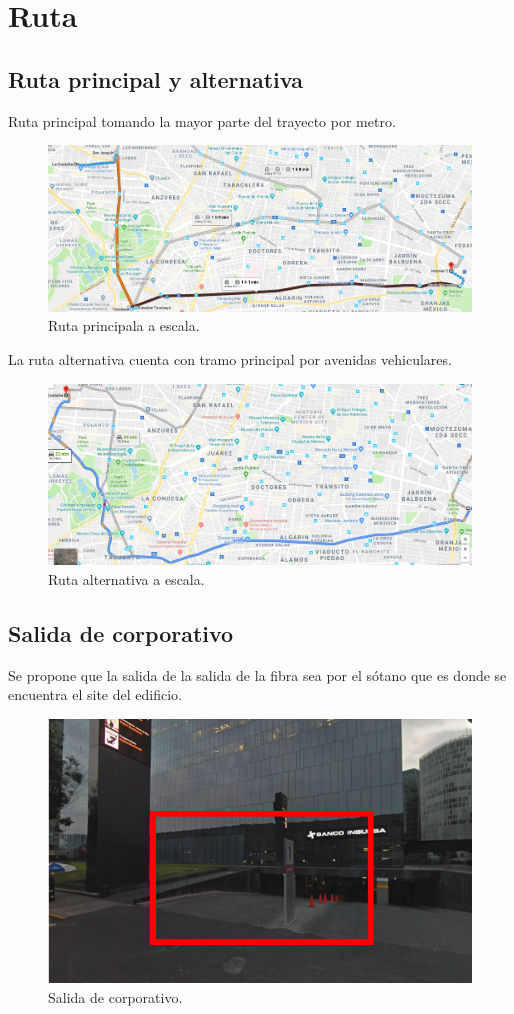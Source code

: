 \documentclass[12pt,letterpaper]{article}
\begin{document}


\newpage
\tableofcontents
\listoffigures

\newpage
\section{Ruta}
\subsection{Ruta principal y alternativa}
Ruta principal tomando la mayor parte del trayecto por metro.
\begin{figure}[ht]
    \centering
    \includegraphics[width=.9\textwidth]{f2.png}
    \caption{Ruta principala a escala.}
\end{figure}

La ruta alternativa cuenta con tramo principal por avenidas 
vehiculares.
\begin{figure}[ht]
    \centering
    \includegraphics[width=.9\textwidth]{f3.png}
    \caption{Ruta alternativa a escala.}
\end{figure}

\newpage
\subsection{Salida de corporativo}
Se propone que la salida de la salida de la fibra sea por el 
sótano que es donde se encuentra el site del edificio.
\begin{figure}[ht]
    \centering
    \includegraphics[width=.6\textwidth]{f0.png}
    \caption{Salida de corporativo.}
\end{figure}
\end{document}
